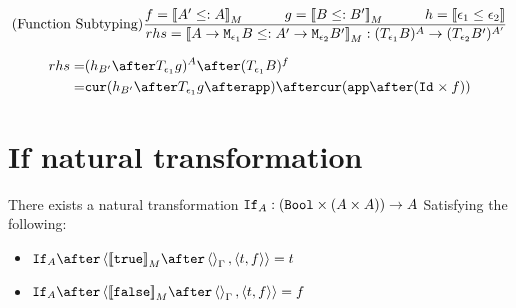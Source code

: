 \documentclass{report}
\begin{document}
$$
\treerule{Function Subtyping}{f = \deno{A' \subtype A} \s\s g = \deno{B \subtype B'} \s\s h=\dse{\e_1}{\e_2}}{rhs = \deno{\lamtype{A}{\e_1}{B} \subtype \lamtype{A'}{\e_2}{B'}}: (\T{\e_1}{B})^A \rightarrow (\T{\e_2}{B'})^{A'}}
$$

\begin{equation}
    \begin{split}
        rhs = & (h_{B'} \after \T{\e_1}{g})^A \after (\T{\e_1}{B})^f \\
        = & \cur{h_{B'}  \after \T{\e_1}{g}\after \app} \after \cur{\app \after (\Id{} \times f)}\\
    \end{split}
\end{equation}



\section{If natural transformation}
There exists a natural transformation $\texttt{If}_{A}: (\texttt{Bool} \times (A \times A)) \rightarrow A$
Satisfying the following:
\begin{itemize}
    \item $\ifnt{A}  \after \pr{\deno{\t}\after \term{\G}}{\pr{t}{f}} = t$
    \item $\ifnt{A} \after \pr{\deno{\f}\after \term{\G}}{\pr{t}{f}} = f$
\end{itemize}
\end{document}
